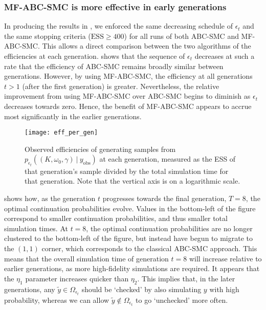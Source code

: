 \documentclass[12pt, onecolumn]{article}
\newcommand{\obs}[1]{#1_{\mathrm{obs}}}
\begin{document}
\subsubsection{MF-ABC-SMC is more effective in early generations}
\label{s:Results:Generations} 

In producing the results in , we enforced the same decreasing schedule of $\epsilon_t$ and the same stopping criteria ($\mathrm{ESS} \geq 400$) for all runs of both ABC-SMC and MF-ABC-SMC.
This allows a direct comparison between the two algorithms of the efficiencies at each generation.
 shows that the sequence of $\epsilon_t$ decreases at such a rate that the efficiency of ABC-SMC remains broadly similar between generations.
However, by using MF-ABC-SMC, the efficiency at all generations $t>1$ (after the first generation) is greater.
Nevertheless, the relative improvement from using MF-ABC-SMC over ABC-SMC begins to diminish as $\epsilon_t$ decreases towards zero.
Hence, the benefit of MF-ABC-SMC appears to accrue most significantly in the earlier generations.

\begin{figure}
\centering
\texttt{[image: eff\_per\_gen]}
\caption{
Observed efficiencies of generating samples from $p_{\epsilon_t}((K, \omega_0, \gamma)~|~\obs y)$ at each generation, measured as the ESS of that generation's sample divided by the total simulation time for that generation.
Note that the vertical axis is on a logarithmic scale.
}
\label{fig:efficiencies_generation}
\end{figure}

 shows how, as the generation $t$ progresses towards the final generation, $T=8$, the optimal continuation probabilities evolve.
Values in the bottom-left of the figure correspond to smaller continuation probabilities, and thus smaller total simulation times.
At $t=8$, the optimal continuation probabilities are no longer clustered to the bottom-left of the figure, but instead have begun to migrate to the $(1,1)$ corner, which corresponds to the classical ABC-SMC approach.
This means that the overall simulation time of generation $t=8$ will increase relative to earlier generations, as more high-fidelity simulations are required.
It appears that the $\eta_1$ parameter increases quicker than $\eta_2$.
This implies that, in the later generations, any $\tilde y \in \Omega_{\epsilon_t}$ should be `checked' by also simulating $y$ with high probability, whereas we can allow $\tilde y \notin \Omega_{\epsilon_t}$ to go `unchecked' more often.
\end{document}
